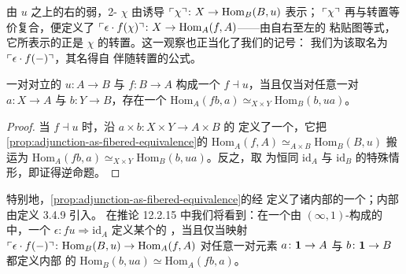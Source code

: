 \begin{observation}[转置等价]
\begin{center}
\end{center}
由 $u$ 之上的右\trCommaCone{}的弱\trUniversalProperty，2-\trCell{} $\chi$
由诱导\trFunctor{} $\ulcorner\chi\urcorner\colon X\to\mathrm{Hom}_B(B,u)$ 表示；
$\ulcorner\chi\urcorner$ 再与转置等价复合，便定义了\trFunctor{}
$\ulcorner\epsilon\cdot f(\chi)\urcorner\colon X\to\mathrm{Hom}_A(f,A)$——由自右至左的%
粘贴图等式，它所表示的正是 $\chi$ 的转置。这一观察也正当化了我们的记号：
我们为该\trFiberedEquivalence{}取名为 $\ulcorner\epsilon\cdot f(-)\urcorner$，其名得自%
伴随转置的公式。
\end{observation}

\begin{corollary}\label{cor:adjunction-generalized-elements}
一对对立的\trFunctor{} $u\colon A\to B$ 与 $f\colon B\to A$ 构成一个%
\trAdjunction{} $f\dashv u$，当且仅当对任意一对\trGeneralizedElement{}
$a\colon X\to A$ 与 $b\colon Y\to B$，存在一个\trEquivalence{}
$\mathrm{Hom}_A(fb,a)\simeq_{X\times Y}\mathrm{Hom}_B(b,ua)$。
\end{corollary}

\begin{proof}
当 $f\dashv u$ 时，沿 $a\times b\colon X\times Y\to A\times B$ 的\trPullback{}%
定义了一个\trCosmologicalFunctor，它把\cref{prop:adjunction-as-fibered-equivalence}的%
\trEquivalence{} $\mathrm{Hom}_A(f,A)\simeq_{A\times B}\mathrm{Hom}_B(B,u)$
搬运为\trEquivalence{}
$\mathrm{Hom}_A(fb,a)\simeq_{X\times Y}\mathrm{Hom}_B(b,ua)$。反之，取%
\trGeneralizedElement{}为恒同\trFunctor{} $\mathrm{id}_A$ 与 $\mathrm{id}_B$
的特殊情形，即证得逆命题。
\end{proof}

\begin{remark}\label{rem:internal-mapping-spaces}
特别地，\cref{prop:adjunction-as-fibered-equivalence}的\trEquivalence{}经%
\trPullback{}定义了诸内部\trMappingSpace{}的一个\trEquivalence；内部%
\trMappingSpace{}由定义 3.4.9 引入。
在推论 12.2.15 中我们将看到：在一个由 $(\infty,1)$-\trCategory{}构成的%
\trInfinityCosmos{}中，一个\trNaturalTransformation{}
$\epsilon\colon fu\Rightarrow\mathrm{id}_A$ 定义某个\trAdjunction{}的%
\trCounit，当且仅当映射
$\ulcorner\epsilon\cdot f(-)\urcorner\colon\mathrm{Hom}_B(B,u)\to\mathrm{Hom}_A(f,A)$
对任意一对元素 $a\colon\mathbf{1}\to A$ 与 $b\colon\mathbf{1}\to B$ 都定义内部%
\trMappingSpace{}的\trEquivalence{}
$\mathrm{Hom}_B(b,ua)\simeq\mathrm{Hom}_A(fb,a)$。
\end{remark}

